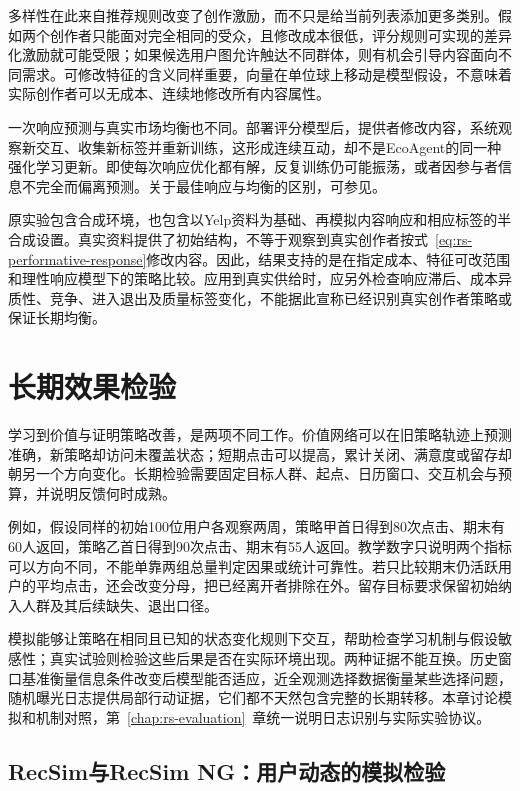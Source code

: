 多样性在此来自推荐规则改变了创作激励，而不只是给当前列表添加更多类别。假如两个创作者只能面对完全相同的受众，且修改成本很低，评分规则可实现的差异化激励就可能受限；如果候选用户图允许触达不同群体，则有机会引导内容面向不同需求。可修改特征的含义同样重要，向量在单位球上移动是模型假设，不意味着实际创作者可以无成本、连续地修改所有内容属性。

一次响应预测与真实市场均衡也不同。部署评分模型后，提供者修改内容，系统观察新交互、收集新标签并重新训练，这形成连续互动，却不是EcoAgent的同一种强化学习更新。即使每次响应优化都有解，反复训练仍可能振荡，或者因参与者信息不完全而偏离预测。关于最佳响应与均衡的区别，可参见。

原实验包含合成环境，也包含以Yelp资料为基础、再模拟内容响应和相应标签的半合成设置。真实资料提供了初始结构，不等于观察到真实创作者按式~\eqref{eq:rs-performative-response}修改内容。因此，结果支持的是在指定成本、特征可改范围和理性响应模型下的策略比较。应用到真实供给时，应另外检查响应滞后、成本异质性、竞争、进入退出及质量标签变化，不能据此宣称已经识别真实创作者策略或保证长期均衡。

\section{长期效果检验}
\label{sec:rs-long-term-evaluation}

学习到价值与证明策略改善，是两项不同工作。价值网络可以在旧策略轨迹上预测准确，新策略却访问未覆盖状态；短期点击可以提高，累计关闭、满意度或留存却朝另一个方向变化。长期检验需要固定目标人群、起点、日历窗口、交互机会与预算，并说明反馈何时成熟。

例如，假设同样的初始100位用户各观察两周，策略甲首日得到80次点击、期末有60人返回，策略乙首日得到90次点击、期末有55人返回。教学数字只说明两个指标可以方向不同，不能单靠两组总量判定因果或统计可靠性。若只比较期末仍活跃用户的平均点击，还会改变分母，把已经离开者排除在外。留存目标要求保留初始纳入人群及其后续缺失、退出口径。

模拟能够让策略在相同且已知的状态变化规则下交互，帮助检查学习机制与假设敏感性；真实试验则检验这些后果是否在实际环境出现。两种证据不能互换。历史窗口基准衡量信息条件改变后模型能否适应，近全观测选择数据衡量某些选择问题，随机曝光日志提供局部行动证据，它们都不天然包含完整的长期转移。本章讨论模拟和机制对照，第~\ref{chap:rs-evaluation}~章统一说明日志识别与实际实验协议。

\subsection{RecSim与RecSim NG：用户动态的模拟检验}
\label{sec:rs-recsim}

